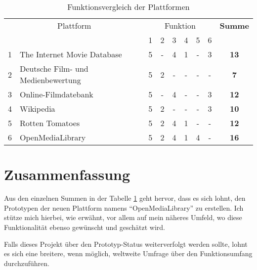 \begin{table}[h]
\begin{center}
    \begin{tabular}{llccccccc}
        \toprule
        \multicolumn{2}{c}{Plattform} & \multicolumn{6}{c}{Funktion} & \textbf{Summe} \\
        \multicolumn{2}{c}{} & 1 & 2 & 3 & 4 & 5 & 6 & \\ 
        \midrule 1 & The Internet Movie Database & 5 & - & 4 & 1 & - & 3 & \textbf{13} \\
        \midrule 2 & Deutsche Film- und Medienbewertung & 5 & 2 & - & - & - & - & \textbf{7} \\ 
        \midrule 3 & Online-Filmdatebank & 5 & - & 4 & - & - & 3 & \textbf{12} \\ 
        \midrule 4 & Wikipedia & 5 & 2 & - & - & - & 3 & \textbf{10} \\ 
        \midrule 5 & Rotten Tomatoes & 5 & 2 & 4 & 1 & - & - & \textbf{12} \\ 
        \midrule 6 & OpenMediaLibrary & 5 & 2 & 4 & 1 & 4 & - & \textbf{16} \\ 
        \bottomrule
    \end{tabular}
    \caption{Funktionsvergleich der Plattformen}
    \label{tab:funktionen_vergleich}
\end{center}
\end{table}

\section{Zusammenfassung}
Aus den einzelnen Summen in der Tabelle \ref{tab:funktionen_vergleich} geht hervor,
dass es sich lohnt, den Prototypen der neuen Plattform namens ``OpenMediaLibrary'' zu erstellen. 
Ich stütze mich hierbei, wie erwähnt, vor allem auf mein näheres Umfeld, wo diese Funktionalität 
ebenso gewünscht und geschätzt wird.

Falls dieses Projekt über den Prototyp-Status weiterverfolgt werden sollte, lohnt
es sich eine breitere, wenn möglich, weltweite Umfrage über den Funktionsumfang
durchzuführen.